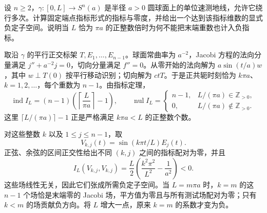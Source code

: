 \begin{exercise}\label{g3:ex:sphere-full-morse-index}
	设 \(n\ge2\)，\(\gamma:[0,L]\to S^n(a)\) 是半径 \(a>0\) 圆球面上的单位速测地线，允许它绕行多次。计算固定端点指标形式的指标与零度，并给出一个达到该指标维数的显式负定子空间。说明当 \(L\) 恰为 \(\pi a\) 的正整数倍时为何不能把末端重数也计入负指标。
\end{exercise}
\begin{solution}
	取沿 \(\gamma\) 的平行正交标架 \(T,E_1,\ldots,E_{n-1}\)。球面常曲率为 \(a^{-2}\)，Jacobi 方程的法向分量满足 \(j''+a^{-2}j=0\)，切向分量满足 \(f''=0\)。从零开始的法向解为 \(a\sin(t/a)w\)，其中 \(w\perp T(0)\) 按平行移动识别；切向解为 \(ctT\)。于是正共轭时刻恰为 \(k\pi a\)、\(k=1,2,\ldots\)，每个重数为 \(n-1\)。由指标定理，
	\[
		\operatorname{ind}I_L=(n-1)\left(\left\lceil\frac{L}{\pi a}\right\rceil-1\right),
		\qquad
		\operatorname{nul}I_L=
		\begin{cases}
		n-1,&L/(\pi a)\in\mathbb Z_{>0},\\
		0,&L/(\pi a)\notin\mathbb Z_{>0}.
		\end{cases}
	\]
	这里 \(\lceil L/(\pi a)\rceil-1\) 正是严格满足 \(k\pi a<L\) 的正整数个数。

	对这些整数 \(k\) 以及 \(1\le j\le n-1\)，取
	\[
		V_{k,j}(t)=\sin(k\pi t/L)E_j(t).
	\]
	正弦、余弦的区间正交性给出不同 \((k,j)\) 之间的指标配对为零，并且
	\[
		I_L(V_{k,j},V_{k,j})=
		\frac L2\left(\frac{k^2\pi^2}{L^2}-\frac1{a^2}\right)<0.
	\]
	这些场线性无关，因此它们张成所需负定子空间。当 \(L=m\pi a\) 时，\(k=m\) 的这 \(n-1\) 个场恰是末端零的 Jacobi 场，平方值为零且与所有测试场配对为零；只有 \(k<m\) 的场贡献负方向。将 \(L\) 增大一点，原来 \(k=m\) 的系数才变为负。
\end{solution}

